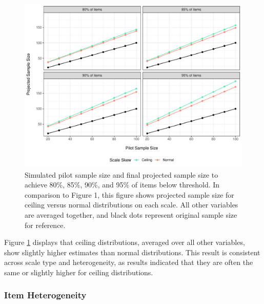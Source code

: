 \documentclass[
  man]{apa7}
\begin{document}
\begin{figure}
\centering
\includegraphics{manuscript_draft_files/figure-latex/scale-skew-figure-1.pdf}
\caption{\label{fig:scale-skew-figure}Simulated pilot sample size and final projected sample size to achieve 80\%, 85\%, 90\%, and 95\% of items below threshold. In comparison to Figure 1, this figure shows projected sample size for ceiling versus normal distributions on each scale. All other variables are averaged together, and black dots represent original sample size for reference.}
\end{figure}

Figure \ref{fig:scale-skew-figure} displays that ceiling distributions, averaged over all other variables, show slightly higher estimates than normal distributions. This result is consistent across scale type and heterogeneity, as results indicated that they are often the same or slightly higher for ceiling distributions.

\hypertarget{item-heterogeneity}{%
\subsubsection{Item Heterogeneity}\label{item-heterogeneity}}
\end{document}

